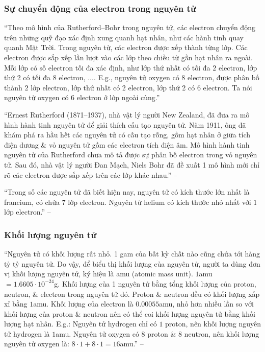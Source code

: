 \documentclass{article}
\numberwithin{equation}{section}
\begin{document}
\subsubsection{Sự chuyển động của electron trong nguyên tử}
``Theo mô hình của Rutherford--Bohr trong nguyên tử, các electron chuyển động trên những quỹ đạo xác định xung quanh hạt nhân, như các hành tinh quay quanh Mặt Trời. Trong nguyên tử, các electron được xếp thành từng lớp. Các electron được sắp xếp lần lượt vào các lớp theo chiều từ gần hạt nhân ra ngoài. Mỗi lớp có số electron tối đa xác định, như lớp thứ nhất có tối đa $2$ electron, lớp thứ 2 có tối đa $8$ electron, $\ldots$. E.g., nguyên tử oxygen có $8$ electron, được phân bố thành $2$ lớp electron, lớp thứ nhất có 2 electron, lớp thứ 2 có $6$ electron. Ta nói nguyên tử oxygen có $6$ electron ở lớp ngoài cùng.''

``Ernest Rutherford (1871--1937), nhà vật lý người New Zealand, đã đưa ra mô hình hành tinh nguyên tử để giải thích cấu tạo nguyên tử. Năm 1911, ông đã khám phá ra hầu hết các nguyên tử có cấu tạo rỗng, gồm hạt nhân ở giữa tích điện dương \& vỏ nguyên tử gồm các electron tích điện âm. Mô hình hành tinh nguyên tử của Rutherford chưa mô tả được sự phân bố electron trong vỏ nguyên tử. Sau đó, nhà vật lý người Đan Mạch, Niels Bohr đã đề xuất 1 mô hình mới chỉ rõ các electron được sắp xếp trên các lớp khác nhau.'' -- \cite[p. 12]{SGK_KHTN_7_Canh_Dieu}

``Trong số các nguyên tử đã biết hiện nay, nguyên tử có kích thước lớn nhất là francium, có chứa $7$ lớp electron. Nguyên tử helium có kích thước nhỏ nhất với $1$ lớp electron.'' -- \cite[p. 13]{SGK_KHTN_7_Canh_Dieu}

\subsubsection{Khối lượng nguyên tử}
``Nguyên tử có khối lượng rất nhỏ. 1 gam của bất kỳ chất nào cũng chứa tới hàng tỷ tỷ nguyên tử. Do vậy, để biểu thị khối lượng của nguyên tử, người ta dùng đơn vị khối lượng nguyên tử, ký hiệu là amu (atomic mass unit). $1$amu $= 1.6605\cdot 10^{-24}$g. Khối lượng của 1 nguyên tử bằng tổng khối lượng của proton, neutron, \& electron trong nguyên tử đó. Proton \& neutron đều có khối lượng xấp xỉ bằng $1$amu. Khối lượng của electron là $0.00055$amu, nhỏ hơn nhiều lần so với khối lượng của proton \& neutron nên có thể coi khối lượng nguyên tử bằng khối lượng hạt nhân. E.g.: Nguyên tử hydrogen chỉ có $1$ proton, nên khối lượng nguyên tử hydrogen là $1$amu. Nguyên tử oxygen có $8$ proton \& $8$ neutron, nên khối lượng nguyên tử oxygen là: $8\cdot 1 + 8\cdot 1 = 16$amu.'' -- \cite[p. 13]{SGK_KHTN_7_Canh_Dieu}
\end{document}
